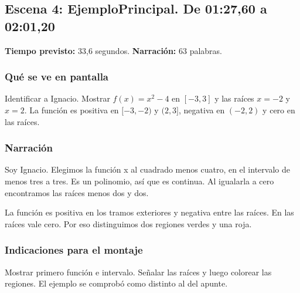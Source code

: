 \documentclass[11pt,a4paper]{article}
\newcommand{\escena}[4]{\textbf{Escena #1: #2.} De #3 a #4}
\begin{document}
\noindent\begin{minipage}[t]{\textwidth}
\subsection*{\escena{4}{EjemploPrincipal}{01:27,60}{02:01,20}}

\textbf{Tiempo previsto:} 33,6 segundos. \textbf{Narración:} 63 palabras.

\subsubsection*{Qué se ve en pantalla}
Identificar a Ignacio. Mostrar $f(x)=x^2-4$ en $[-3,3]$ y las raíces $x=-2$ y $x=2$. La función es positiva en $[-3,-2)$ y $(2,3]$, negativa en $(-2,2)$ y cero en las raíces.

\subsubsection*{Narración}
Soy Ignacio. Elegimos la función x al cuadrado menos cuatro, en el intervalo de menos tres a tres. Es un polinomio, así que es continua. Al igualarla a cero encontramos las raíces menos dos y dos.

La función es positiva en los tramos exteriores y negativa entre las raíces. En las raíces vale cero. Por eso distinguimos dos regiones verdes y una roja.

\subsubsection*{Indicaciones para el montaje}
Mostrar primero función e intervalo. Señalar las raíces y luego colorear las regiones. El ejemplo se comprobó como distinto al del apunte.
\end{minipage}\par\medskip
\end{document}
